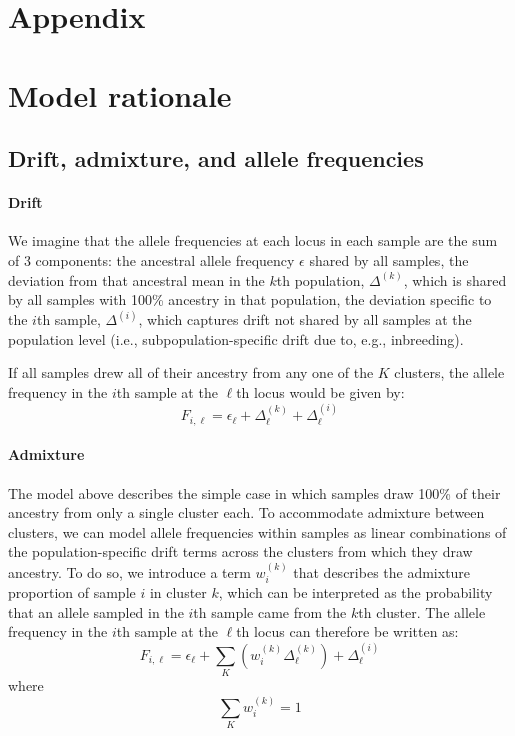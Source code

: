 \documentclass[12pt]{article}
\begin{document}
\newpage
\section*{Appendix}
\renewcommand{\theequation}{A\arabic{equation}}
\setcounter{equation}{0}
\renewcommand{\thetable}{A\arabic{table}}
\setcounter{table}{0}
\renewcommand{\thefigure}{A\arabic{figure}}
\setcounter{figure}{0}
\renewcommand{\thesection}{A\arabic{section}}
\setcounter{section}{0}


\section{Model rationale}
\subsection{Drift, admixture, and allele frequencies}
\paragraph{Drift} 
We imagine that the allele frequencies at each locus in each sample are the sum of 3 components: 
the ancestral allele frequency $\epsilon$ shared by all samples,
the deviation from that ancestral mean in the $k$th population, $\Delta^{(k)}$,
which is shared by all samples with 100\% ancestry in that population,
the deviation specific to the $i$th sample, $\Delta^{(i)}$,
which captures drift not shared by all samples at the population level
(i.e., subpopulation-specific drift due to, e.g., inbreeding).

If all samples drew all of their ancestry from any one of the $K$ clusters,
the  allele frequency in the $i$th sample at the $\ell$th locus would be given by:
\begin{equation}
F_{i,\ell} = \epsilon_{\ell} + \Delta^{(k)}_{\ell} + \Delta^{(i)}_{\ell}
\label{drift_terms_no_admix}
\end{equation}

\paragraph{Admixture} 
The model above describes the simple case 
in which samples draw 100\% of their ancestry from only a single cluster each. 
To accommodate admixture between clusters, 
we can model allele frequencies within samples as linear combinations of the population-specific 
drift terms across the clusters from which they draw ancestry.
To do so, we introduce a term $w^{(k)}_{i}$ that describes the admixture proportion of sample $i$ in cluster $k$,
which can be interpreted as the probability that an allele sampled in the $i$th sample came from the $k$th cluster.
The allele frequency in the $i$th sample at the $\ell$th locus can therefore be written as:
%
\begin{equation}
F_{i,\ell} = \epsilon_{\ell} + \sum\limits_{K} \left( w^{(k)}_{i} \Delta^{(k)}_{\ell} \right) + \Delta^{(i)}_{\ell}	
\label{drift_terms_admix}
\end{equation}
%
where
%
\begin{equation}
\sum\limits_{K}w^{(k)}_{i} = 1
\end{equation}
\end{document}
